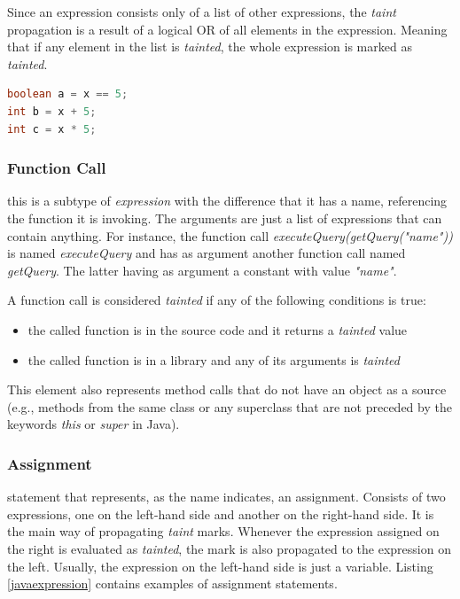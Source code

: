 Since an expression consists only of a list of other expressions, the \textit{taint} propagation is a result of a logical OR of all elements in the expression. Meaning that if any element in the list is \textit{tainted}, the whole expression is marked as \textit{tainted}. 

\begin{lstlisting}[language=Java,
    showstringspaces=false,
    caption={Expression assignment examples},
    label=javaexpression]
boolean a = x == 5;
int b = x + 5;
int c = x * 5;
\end{lstlisting}

\subsubsection{Function Call} this is a subtype of \textit{expression} with the difference that it has a name, referencing the function it is invoking. The arguments are just a list of expressions that can contain anything. For instance, the function call \textit{executeQuery(getQuery("name"))} is named \textit{executeQuery} and has as argument another function call named \textit{getQuery}. The latter having as argument a constant with value \textit{"name"}.

A function call is considered \textit{tainted} if any of the following conditions is true: 
\begin{itemize}
    \item the called function is in the source code and it returns a \textit{tainted} value
    \item the called function is in a library and any of its arguments is \textit{tainted}
\end{itemize}

This element also represents method calls that do not have an object as a source (e.g., methods from the same class or any superclass that are not preceded by the keywords \textit{this} or \textit{super} in Java).


\subsubsection{Assignment} statement that represents, as the name indicates, an assignment. Consists of two expressions, one on the left-hand side and another on the right-hand side. It is the main way of propagating \textit{taint} marks. Whenever the expression assigned on the right is evaluated as \textit{tainted}, the mark is also propagated to the expression on the left. Usually, the expression on the left-hand side is just a variable. Listing \ref{javaexpression} contains examples of assignment statements.


